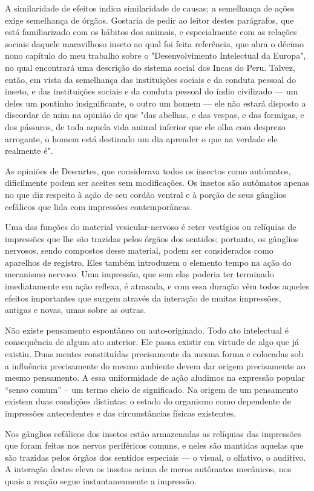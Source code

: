 \documentclass[11pt,a5paper,twoside,openany]{book}
\begin{document}
A similaridade de efeitos indica similaridade de causas; a semelhança de ações exige semelhança de órgãos. Gostaria de pedir ao leitor destes parágrafos, que está familiarizado com os hábitos dos animais, e especialmente com as relações sociais daquele maravilhoso inseto ao qual foi feita referência, que abra o décimo nono capítulo do meu trabalho sobre o "Desenvolvimento Intelectual da Europa", no qual encontrará uma descrição do sistema social dos Incas do Peru. Talvez, então, em vista da semelhança das instituições sociais e da conduta pessoal do inseto, e das instituições sociais e da conduta pessoal do índio civilizado — um deles um pontinho insignificante, o outro um homem — ele não estará disposto a discordar de mim na opinião de que "das abelhas, e das vespas, e das formigas, e dos pássaros, de toda aquela vida animal inferior que ele olha com desprezo arrogante, o homem está destinado um dia aprender o que na verdade ele realmente é".

As opiniões de Descartes, que considerava todos os insectos como autómatos, dificilmente podem ser aceites sem modificações. Os insetos são autômatos apenas no que diz respeito à ação de seu cordão ventral e à porção de seus gânglios cefálicos que lida com impressões contemporâneas.

Uma das funções do material vesicular-nervoso é reter vestígios ou relíquias de impressões que lhe são trazidas pelos órgãos dos sentidos; portanto, os gânglios nervosos, sendo compostos desse material, podem ser considerados como aparelhos de registro. Eles também introduzem o elemento tempo na ação do mecanismo nervoso. Uma impressão, que sem elas poderia ter terminado imediatamente em ação reflexa, é atrasada, e com essa duração vêm todos aqueles efeitos importantes que surgem através da interação de muitas impressões, antigas e novas, umas sobre as outras.

Não existe pensamento espontâneo ou auto-originado. Todo ato intelectual é consequência de algum ato anterior. Ele passa existir em virtude de algo que já existiu. Duas mentes constituídas precisamente da mesma forma e colocadas sob a influência precisamente do mesmo ambiente devem dar origem precisamente ao mesmo pensamento. A essa uniformidade de ação aludimos na expressão popular “senso comum” – um termo cheio de significado. Na origem de um pensamento existem duas condições distintas: o estado do organismo como dependente de impressões antecedentes e das circunstâncias físicas existentes.

Nos gânglios cefálicos dos insetos estão armazenadas as relíquias das impressões que foram feitas nos nervos periféricos comuns, e neles são mantidas aquelas que são trazidas pelos órgãos dos sentidos especiais — o visual, o olfativo, o auditivo. A interação destes eleva os insetos acima de meros autômatos mecânicos, nos quais a reação segue instantaneamente a impressão.
\end{document}
